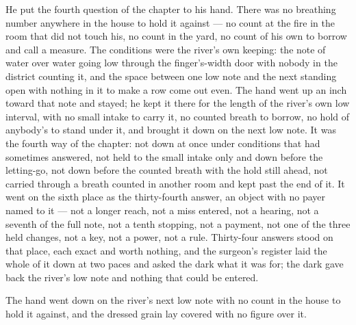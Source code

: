 He put the fourth question of the chapter to his hand. There was no breathing number anywhere in the house to hold it against --- no count at the fire in the room that did not touch his, no count in the yard, no count of his own to borrow and call a measure. The conditions were the river's own keeping: the note of water over water going low through the finger's-width door with nobody in the district counting it, and the space between one low note and the next standing open with nothing in it to make a row come out even. The hand went up an inch toward that note and stayed; he kept it there for the length of the river's own low interval, with no small intake to carry it, no counted breath to borrow, no hold of anybody's to stand under it, and brought it down on the next low note. It was the fourth way of the chapter: not down at once under conditions that had sometimes answered, not held to the small intake only and down before the letting-go, not down before the counted breath with the hold still ahead, not carried through a breath counted in another room and kept past the end of it. It went on the sixth place as the thirty-fourth answer, an object with no payer named to it --- not a longer reach, not a miss entered, not a hearing, not a seventh of the full note, not a tenth stopping, not a payment, not one of the three held changes, not a key, not a power, not a rule. Thirty-four answers stood on that place, each exact and worth nothing, and the surgeon's register laid the whole of it down at two paces and asked the dark what it was for; the dark gave back the river's low note and nothing that could be entered.

The hand went down on the river's next low note with no count in the house to hold it against, and the dressed grain lay covered with no figure over it.

